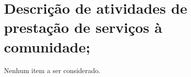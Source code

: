\section{Descrição de atividades de prestação de serviços à comunidade;}

Nenhum item a ser considerado.